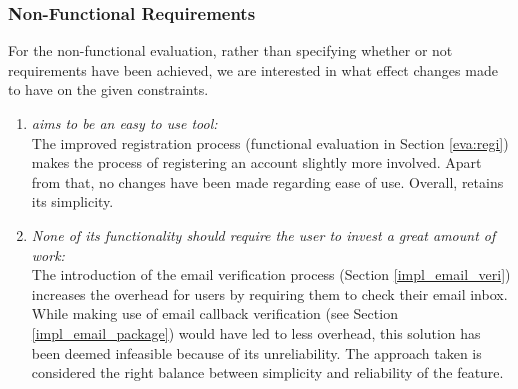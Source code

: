 \subsubsection{Non-Functional Requirements}

For the non-functional evaluation, rather than specifying whether or not requirements have been achieved, we are interested in what effect changes made to \lcs have on the given constraints.

\begin{enumerate}
	\item\textit{\lcs aims to be an easy to use tool:}\\
		The improved registration process (functional evaluation in Section \ref{eva:regi}) makes the process of registering an account slightly more involved. Apart from that, no changes have been made regarding ease of use. Overall, \lcs retains its simplicity.
				
	\item\textit{None of its functionality should require the user to invest a great amount of work:}\\
		The introduction of the email verification process (Section \ref{impl_email_veri}) increases the overhead for users by requiring them to check their email inbox. While making use of email callback verification (see Section \ref{impl_email_package}) would have led to less overhead, this solution has been deemed infeasible because of its unreliability. The approach taken is considered the right balance between simplicity and reliability of the feature.
		

\end{enumerate}
